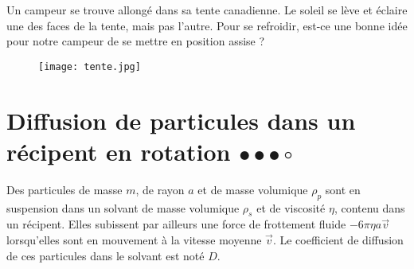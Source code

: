 Un campeur se trouve allongé dans sa tente canadienne. Le soleil se lève et éclaire une des faces de la tente, mais pas l'autre. Pour se refroidir, est-ce une bonne idée pour notre campeur de se mettre en position assise ? 
	
\vspace*{2cm}	
	
\begin{figure}[h!]
\centering
  \texttt{[image: tente.jpg]}
\end{figure}

\newpage	

\section{Diffusion de particules dans un récipent en rotation $\bullet\bullet\bullet\circ$}

Des particules de masse $m$, de rayon $a$ et de masse volumique $\rho_p$ sont en suspension dans un solvant de masse volumique $\rho_s$ et de viscosité $\eta$, contenu dans un récipent. Elles subissent par ailleurs une force de frottement fluide $-6\pi\eta a\vec{v}$ lorsqu'elles sont en mouvement à la vitesse moyenne $\vec{v}$. Le coefficient de diffusion de ces particules dans le solvant est noté $D$.

